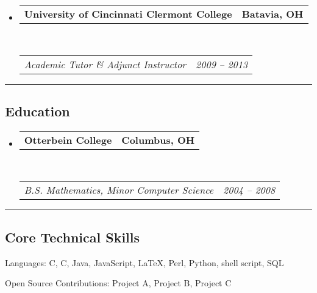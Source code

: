 \documentclass[10pt,letterpaper]{article}
\makeatletter
\newenvironment{indentsection}[1]%
{\begin{list}{}%
	{\setlength{\leftmargin}{#1}}%
	\item[]%
}
{\end{list}}
\newcommand{\headerrow}[2]
{\begin{tabular*}{\linewidth}{l@{\extracolsep{\fill}}r}
	#1 &
	#2 \\
\end{tabular*}}
\newcommand{\CPP}
{C\nolinebreak[4]\hspace{-.05em}\raisebox{.22ex}{\footnotesize\bf ++}}
\makeatother
\begin{document}
\begin{itemize}
\begin{itemize*}
	\end{itemize*}

	\item
	\headerrow
		{\textbf{University of Cincinnati Clermont College}}
		{\textbf{Batavia, OH}}
	\\
	\headerrow
		{\emph{Academic Tutor \& Adjunct Instructor}}
		{\emph{2009 -- 2013}}

\end{itemize}


\hrule
\vspace{-0.4em}
\subsection*{Education}

\begin{itemize}
	\parskip=0.1em

	\item
	\headerrow
		{\textbf{Otterbein College}}
		{\textbf{Columbus, OH}}
	\\
	\headerrow
		{\emph{B.S. Mathematics, Minor Computer Science}}
		{\emph{2004 -- 2008}}

\end{itemize}


\hrule
\vspace{-0.4em}
\subsection*{Core Technical Skills}

\begin{indentsection}{\parindent}
\begin{description*}
	\item[Languages:]
	C, \CPP, Java, JavaScript, \LaTeX, Perl, Python, shell script, SQL
	\item[Open Source Contributions:]
	Project A, Project B, Project C
\end{description*}
\end{indentsection}
\end{document}
